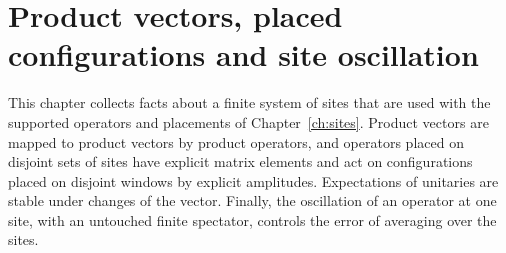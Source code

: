 \chapter{Product vectors, placed configurations and site oscillation}
\label{ch:siteconfig}

This chapter collects facts about a finite system of sites that are used with
the supported operators and placements of Chapter~\ref{ch:sites}. Product
vectors are mapped to product vectors by product operators, and operators
placed on disjoint sets of sites have explicit matrix elements and act on
configurations placed on disjoint windows by explicit amplitudes. Expectations
of unitaries are stable under changes of the vector. Finally, the oscillation
of an operator at one site, with an untouched finite spectator, controls the
error of averaging over the sites.




